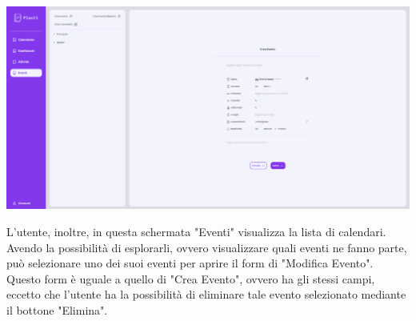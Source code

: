 \begin{center}
    \includegraphics[width=1\textwidth, height=0.3\textheight]{img/png/FrontEnd/Eventi/EventiCreaEvento.png}
\end{center}

L'utente, inoltre, in questa schermata "Eventi" visualizza la lista di calendari. Avendo la possibilità di esplorarli, ovvero visualizzare quali eventi ne fanno parte, può selezionare uno dei suoi eventi per aprire il form di "Modifica Evento". Questo form è uguale a quello di "Crea Evento", ovvero ha gli stessi campi, eccetto che l'utente ha la possibilità di eliminare tale evento selezionato mediante il bottone "Elimina".

